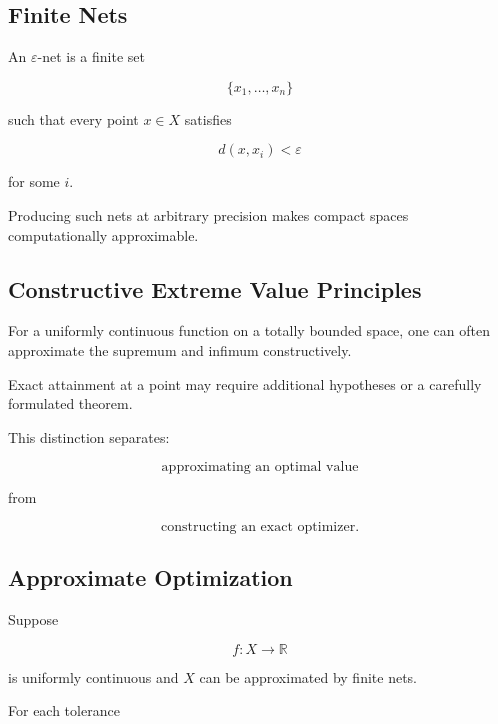 \subsection{Finite Nets}
\label{subsec:finite-nets}

An \(\varepsilon\)-net is a finite set

\[
\boxed{
\{x_1,\ldots,x_n\}
}
\]

such that every point \(x\in X\) satisfies

\[
\boxed{
d(x,x_i)<\varepsilon
}
\]

for some \(i\).

Producing such nets at arbitrary precision makes compact spaces
computationally approximable.

\subsection{Constructive Extreme Value Principles}
\label{subsec:constructive-extreme-value}

For a uniformly continuous function on a totally bounded space, one can
often approximate the supremum and infimum constructively.

Exact attainment at a point may require additional hypotheses or a
carefully formulated theorem.

This distinction separates:

\[
\boxed{
\text{approximating an optimal value}
}
\]

from

\[
\boxed{
\text{constructing an exact optimizer}.
}
\]

\subsection{Approximate Optimization}
\label{subsec:constructive-approximate-optimization}

Suppose

\[
f:X\to\mathbb{R}
\]

is uniformly continuous and \(X\) can be approximated by finite nets.

For each tolerance

